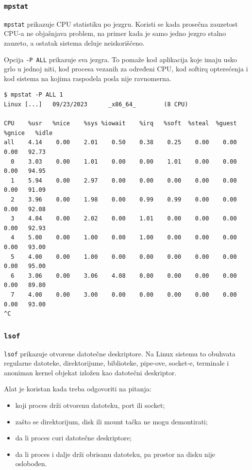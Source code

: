 \subsubsection{\texorpdfstring{\texttt{mpstat}}{mpstat}}\label{mpstat}

\texttt{mpstat} prikazuje CPU statistiku po jezgru. Koristi se kada prosečna zauzetost CPU-a ne objašnjava problem, na primer kada je samo jedno jezgro stalno zauzeto, a ostatak sistema deluje neiskorišćeno.

Opcija \texttt{-P ALL} prikazuje sva jezgra. To pomaže kod aplikacija koje imaju usko grlo u jednoj niti, kod procesa vezanih za određeni CPU, kod softirq opterećenja i kod sistema na kojima raspodela posla nije ravnomerna.

\begin{verbatim}
$ mpstat -P ALL 1
Linux [...]   09/23/2023      _x86_64_        (8 CPU)

CPU    %usr   %nice    %sys %iowait    %irq   %soft  %steal  %guest  %gnice   %idle
all    4.14    0.00    2.01    0.50    0.38    0.25    0.00    0.00    0.00   92.73
  0    3.03    0.00    1.01    0.00    0.00    1.01    0.00    0.00    0.00   94.95
  1    5.94    0.00    2.97    0.00    0.00    0.00    0.00    0.00    0.00   91.09
  2    3.96    0.00    1.98    0.00    0.99    0.99    0.00    0.00    0.00   92.08
  3    4.04    0.00    2.02    0.00    1.01    0.00    0.00    0.00    0.00   92.93
  4    5.00    0.00    1.00    0.00    1.00    0.00    0.00    0.00    0.00   93.00
  5    4.00    0.00    1.00    0.00    0.00    0.00    0.00    0.00    0.00   95.00
  6    3.06    0.00    3.06    4.08    0.00    0.00    0.00    0.00    0.00   89.80
  7    4.00    0.00    3.00    0.00    0.00    0.00    0.00    0.00    0.00   93.00
^C
\end{verbatim}

\subsubsection{\texorpdfstring{\texttt{lsof}}{lsof}}\label{lsof}

\texttt{lsof} prikazuje otvorene datotečne deskriptore. Na Linux sistemu to obuhvata regularne datoteke, direktorijume, biblioteke, pipe-ove, socket-e, terminale i anoniman kernel objekat izložen kao datotečni deskriptor.

Alat je koristan kada treba odgovoriti na pitanja:

\begin{itemize}
\tightlist
\item
  koji proces drži otvorenu datoteku, port ili socket;
\item
  zašto se direktorijum, disk ili mount tačka ne mogu demontirati;
\item
  da li proces curi datotečne deskriptore;
\item
  da li proces i dalje drži obrisanu datoteku, pa prostor na disku nije oslobođen.
\end{itemize}

